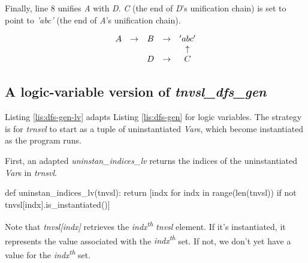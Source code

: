 Finally, line 8  unifies \textit{A} with \textit{D}. \textit{C} (the end of \textit{D}'s unification chain) is set to point to \textit{'abc'} (the end of \textit{A}'s unification chain). %

\begin{equation}\label{eq:three}
\begin{array}{c c c c c c c c c c c}
A & \to & B            & \to & 'abc'      \\ 
  &     &              &     & \uparrow   \\ 
  &     & D            & \to & C        
\end{array}
\end{equation}

\subsection{A logic-variable version of \textit{tnvsl\_dfs\_gen}}
Listing \ref{lis:dfs-gen-lv} adapts Listing \ref{lis:dfs-gen} for logic variables. The strategy is for \textit{trnsvl} to start as a tuple of uninstantiated \textit{Var}s, which become instantiated as the program runs.

First, an adapted \textit{uninstan\_indices\_lv} returns the indices of the uninstantiated \textit{Var}s in \textit{trnsvl}.
\begin{center}
\begin{minipage}[c]{0.45\textwidth}
\begin{python1}
def uninstan_indices_lv(tnvsl):
  return [indx for indx in range(len(tnvsl)) 
               if not tnvsl[indx].is_instantiated()]
\end{python1}
\end{minipage}
\end{center}

Note that \textit{tnvsl[indx]} retrieves the \textit{indx\textsuperscript{th}} \textit{tnvsl} element. If it's instantiated, it represents the value associated with the \textit{indx\textsuperscript{th}} set. If not, we don't yet have a value for the  \textit{indx\textsuperscript{th}} set.

